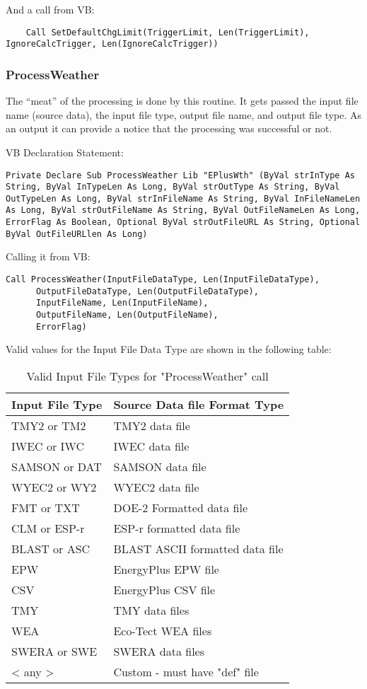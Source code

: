 And a call from VB:

\begin{lstlisting}
    Call SetDefaultChgLimit(TriggerLimit, Len(TriggerLimit), IgnoreCalcTrigger, Len(IgnoreCalcTrigger))
\end{lstlisting}

\subsubsection{ProcessWeather}\label{processweather}

The ``meat'' of the processing is done by this routine. It gets passed the input file name (source data), the input file type, output file name, and output file type. As an output it can provide a notice that the processing was successful or not.

VB Declaration Statement:

\begin{lstlisting}
Private Declare Sub ProcessWeather Lib "EPlusWth" (ByVal strInType As String, ByVal InTypeLen As Long, ByVal strOutType As String, ByVal OutTypeLen As Long, ByVal strInFileName As String, ByVal InFileNameLen As Long, ByVal strOutFileName As String, ByVal OutFileNameLen As Long, ErrorFlag As Boolean, Optional ByVal strOutFileURL As String, Optional ByVal OutFileURLlen As Long)
\end{lstlisting}

Calling it from VB:

\begin{lstlisting}
Call ProcessWeather(InputFileDataType, Len(InputFileDataType),
      OutputFileDataType, Len(OutputFileDataType),
      InputFileName, Len(InputFileName),
      OutputFileName, Len(OutputFileName),
      ErrorFlag)
\end{lstlisting}

Valid values for the Input File Data Type are shown in the following table:

\begin{longtable}[c]{@{}ll@{}}
\caption{Valid Input File Types for "ProcessWeather" call \protect \label{table:valid-input-file-types-for-processweather}}\\
\toprule 
Input File Type & Source Data file Format Type \tabularnewline \midrule
\endhead
TMY2 or TM2 & TMY2 data file \tabularnewline
IWEC or IWC & IWEC data file \tabularnewline
SAMSON or DAT & SAMSON data file \tabularnewline
WYEC2 or WY2 & WYEC2 data file \tabularnewline
FMT or TXT & DOE-2 Formatted data file \tabularnewline
CLM or ESP-r & ESP-r formatted data file \tabularnewline
BLAST or ASC & BLAST ASCII formatted data file \tabularnewline
EPW & EnergyPlus EPW file \tabularnewline
CSV & EnergyPlus CSV file \tabularnewline
TMY & TMY data files \tabularnewline
WEA & Eco-Tect WEA files \tabularnewline
SWERA or SWE & SWERA data files \tabularnewline
< any > & Custom - must have "def" file \tabularnewline
\bottomrule
\end{longtable}

